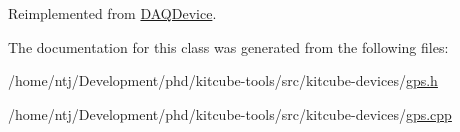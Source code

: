 Reimplemented from \hyperlink{classDAQDevice_a7685cec80865752cc0ef3ab49c6c2277}{D\-A\-Q\-Device}.



The documentation for this class was generated from the following files\-:\begin{DoxyCompactItemize}
\item 
/home/ntj/\-Development/phd/kitcube-\/tools/src/kitcube-\/devices/\hyperlink{gps_8h}{gps.\-h}\item 
/home/ntj/\-Development/phd/kitcube-\/tools/src/kitcube-\/devices/\hyperlink{gps_8cpp}{gps.\-cpp}\end{DoxyCompactItemize}
